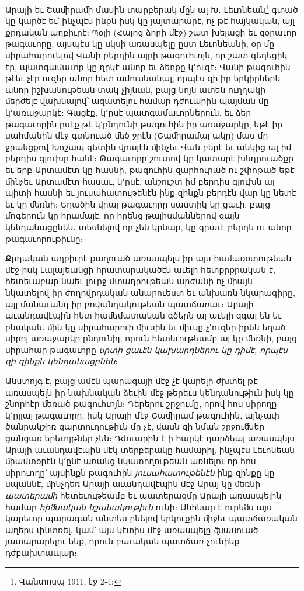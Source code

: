 \documentclass{article}
\begin{document}
{Արայի եւ Շաﬕրաﬕ մասին տարբերակ մըն ալ Խ․ Լեւոնեան\footnote{Վանտոսպ 1911, էջ 2֊4։} գտած կը կարծէ եւ՝ ինչպէս ինքն իսկ կը յայտարարէ, ոչ թէ հայկական, այլ քրդական աղբիւրէ։ Պօլի (Հայոց ձորի մէջ) շատ խելացի եւ զօրաւոր թագաւորը, այսպէս կը սկսի առասպելը ըստ Լեւոնեանի, օր մը սիրահարուելով Վանի բերդին այրի թագուհւոյն, որ շատ գեղեցիկ էր, պատգամաւոր կը ղրկէ անոր եւ ձեոքը կ՚ուզէ։ Վանի թագուհին թէեւ չէր ուզեր անոր հետ ամուսնանալ, որպէս զի իր երկիրներն անոր իշխանութեան տակ չիյնան, բայց նոյն ատեն ուղղակի ﬔրժելէ վախնալով՝ ազատելու համար դժուարին պայման մը կ՚առաջարկէ։ Գացէք, կ՚ըսէ պատգամաւորներուն, եւ ձեր թագաւորին ըսէք թէ կ՚ընդունի թագուհին իր առաջարկը, եթէ իր սահմանին մէջ գտնուած ﬔծ ջրէն (Շաﬕրամայ ակը) մաս մը ջրանցքով Խոշապ գետին վրայէն ﬕնչեւ Վան բերէ եւ անկից ալ իմ բերդիս գլուխը հանէ։ Թագաւորը շուտով կը կատարէ խնդրուածքը եւ երբ Արտամէտ կը հասնի, թագուհին զարհուրած ու շփոթած եթէ ﬕնչեւ Արտամէտ հասաւ, կ՚ըսէ, անշուշտ իմ բերդիս գլուխն ալ պիտի հասնի եւ յուսահատութենէն ինք զինքն բերդէն վար կը նետէ եւ կը ﬔռնի։ Եղածին վրայ թագաւորը սաստիկ կը ցաւի, բայց մոգերուն կը հրամայէ, որ իրենց թալիսմաններով զայն կենդանացընեն․ տեսնելով որ չեն կրնար, կը գրաւէ բերդն ու անոր թագաւորութիւնը։

Քրդական աղբիւրէ քաղուած առասպելս իր այս համառօտութեան մէջ իսկ Լալայեանցի հրատարակածէն աւելի հետքրքրական է, հետեւաբար նաեւ լուրջ մտադրութեան արժանի ոչ ﬕայն նկատելով իր ժողովրդական անարուեստ եւ անխառն նկարագիրը, այլ մանաւանդ իր բովանդակութեան պատճառաւ։ Արայի աւանդավէպին հետ հաﬔմատական գծերն ալ աւելի զգալ են եւ բնական․ ﬕն կը սիրահարուի ﬕւսին եւ ﬕւսը չ՚ուզեր իրեն եղած սիրոյ առաջարկը ընդունիլ, որուն հետեւութեամբ ալ կը ﬔռնի, բայց սիրահար թագաւորը \emph{սրտի ցաւէն կախարդներու կը դիմէ, որպէս զի զինքն կենդանացրնեն}։

Անստոյգ է, բայց ամէն պարագայի մէջ չէ կարելի ժխտել թէ առասպելն իր նախնական ձեւին մէջ թերեւս կենդանութիւն իսկ կը շնորհէր ﬔռած թագուհւոյն։ Դերերու շրջումը, որով հոս սիրողը կ՚ըլլայ թագաւորը, իսկ Արայի մէջ Շաﬕրամ թագուհին, այնչափ ծանրակշիռ զարտուղութիւն մը չէ, վասն զի նման շրջուﬓեր ցանցառ երեւոյթներ չեն։ Դժուարին է ի հարկէ դարձեալ առասպելս Արայի աւանդավէպին մէկ տերբերակը համարիլ, ինչպէս Լեւոնեան ﬕամտօրէն կ՚ընէ առանց նկատողութեան առնելու որ հոս սիրուողը՝ այսինքն թագուհին \emph{յուսահատութենէն} ինք զինքը կը սպաննէ, ﬕնչդեռ Արայի աւանդավէպին մէջ Արայ կը ﬔռնի \emph{պատերաﬕ} հետեւութեամբ եւ պատերազմը Արայի առասպելին համար \emph{հիﬓական նշանակութիւն} ունի։ Անհնար է ուրեﬓ այս կարեւոր պարագան անտես ընելով երկուքին ﬕջեւ պատճառական աղերս փնտռել․ կամ՝ այս կէտիս մէջ առասպելը ﬖասուած յատարարելու ենք, որուն բաւական պատճառ չունինք դժբախտապար։

}
\end{document}
